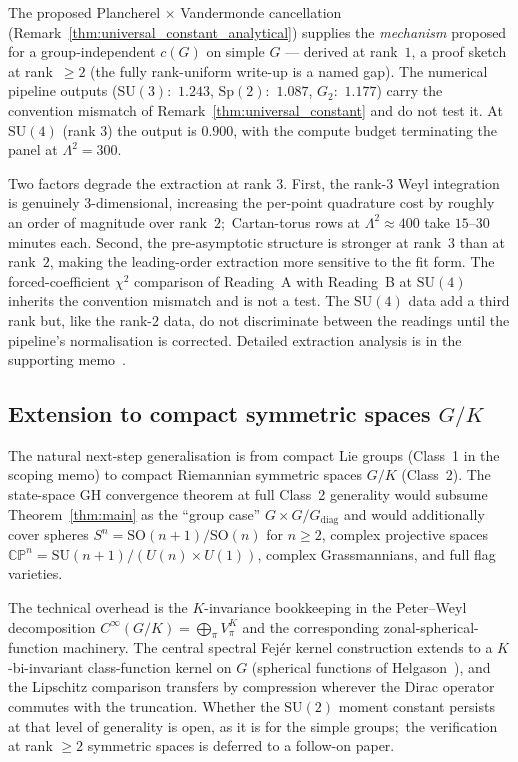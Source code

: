 \documentclass[11pt,a4paper]{article}
\theoremstyle{plain}
\theoremstyle{definition}
\newcommand{\Lammax}{\Lambda}
\newcommand{\SU}{\mathrm{SU}}
\newcommand{\SO}{\mathrm{SO}}
\newcommand{\Sp}{\mathrm{Sp}}
\begin{document}
The proposed Plancherel $\times$ Vandermonde cancellation
(Remark~\ref{thm:universal_constant_analytical}) supplies the
\emph{mechanism} proposed for a group-independent $c(G)$ on simple $G$ ---
derived at rank~$1$, a proof sketch at rank~$\ge 2$ (the fully
rank-uniform write-up is a named gap). The numerical pipeline outputs
($\SU(3)$:\ $1.243$, $\Sp(2)$:\ $1.087$, $G_2$:\ $1.177$) carry the
convention mismatch of Remark~\ref{thm:universal_constant} and do not
test it. At $\SU(4)$ (rank $3$) the output is $0.900$, with the compute
budget terminating the panel at $\Lammax^2 = 300$.

Two factors degrade the extraction at rank $3$. First, the rank-$3$
Weyl integration is genuinely $3$-dimensional, increasing the
per-point quadrature cost by roughly an order of magnitude over
rank~$2$;\ Cartan-torus rows at $\Lammax^2 \approx 400$ take
$15$--$30$ minutes each. Second, the pre-asymptotic structure is
stronger at rank~$3$ than at rank~$2$, making the leading-order
extraction more sensitive to the fit form. The forced-coefficient
$\chi^2$ comparison of Reading~A with Reading~B at $\SU(4)$ inherits the
convention mismatch and is not a test. The $\SU(4)$ data add a third
rank but, like the rank-$2$ data, do not discriminate between the
readings until the pipeline's normalisation is corrected. Detailed
extraction analysis is in the supporting memo~\cite{su4_rate_memo}.

\subsection{Extension to compact symmetric spaces $G/K$}\label{sec:symmetric}

The natural next-step generalisation is from compact Lie groups
(Class~1 in the scoping memo) to compact Riemannian symmetric spaces
$G/K$ (Class~2). The state-space GH convergence theorem at full Class~2
generality would subsume Theorem~\ref{thm:main} as the ``group case''
$G \times G / G_{\mathrm{diag}}$ and would additionally cover spheres
$S^n = \SO(n+1)/\SO(n)$ for $n \ge 2$, complex projective spaces
$\mathbb{CP}^n = \SU(n+1)/(U(n) \times U(1))$, complex
Grassmannians, and full flag varieties.

The technical overhead is the $K$-invariance bookkeeping in the
Peter--Weyl decomposition $C^\infty(G/K) = \bigoplus_\pi V_\pi^K$ and
the corresponding zonal-spherical-function machinery. The central
spectral Fej\'er kernel construction extends to a $K$-bi-invariant
class-function kernel on $G$ (spherical functions of
Helgason~\cite{helgason1984}), and the Lipschitz comparison transfers
by compression wherever the Dirac operator commutes with the
truncation. Whether the $\SU(2)$ moment constant persists at that level
of generality is open, as it is for the simple groups;\ the verification
at rank $\ge 2$ symmetric spaces is deferred to a follow-on paper.
\end{document}
